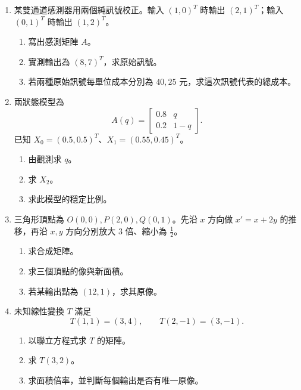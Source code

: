 \documentclass[11pt,a4paper]{article}
\providecommand{\tightlist}{%
  \setlength{\itemsep}{0pt}\setlength{\parskip}{0pt}}
\begin{document}
\begin{enumerate}
\def\labelenumi{\arabic{enumi}.}
\setcounter{enumi}{12}
\item
  某雙通道感測器用兩個純訊號校正。輸入 \((1,0)^T\) 時輸出 \((2,1)^T\)；輸入 \((0,1)^T\) 時輸出 \((1,2)^T\)。

  \begin{enumerate}
  \def\labelenumii{(\arabic{enumii})}
  \tightlist
  \item
    寫出感測矩陣 \(A\)。\\
  \item
    實測輸出為 \((8,7)^T\)，求原始訊號。\\
  \item
    若兩種原始訊號每單位成本分別為 \(40,25\) 元，求這次訊號代表的總成本。
  \end{enumerate}
\item
  兩狀態模型為
  \[
  A(q)=\begin{bmatrix}0.8&q\\0.2&1-q\end{bmatrix}.
  \]
  已知 \(X_0=(0.5,0.5)^T\)、\(X_1=(0.55,0.45)^T\)。

  \begin{enumerate}
  \def\labelenumii{(\arabic{enumii})}
  \tightlist
  \item
    由觀測求 \(q\)。\\
  \item
    求 \(X_2\)。\\
  \item
    求此模型的穩定比例。
  \end{enumerate}
\item
  三角形頂點為 \(O(0,0),P(2,0),Q(0,1)\)。先沿 \(x\) 方向做 \(x'=x+2y\) 的推移，再沿 \(x,y\) 方向分別放大 \(3\) 倍、縮小為 \(\frac12\)。

  \begin{enumerate}
  \def\labelenumii{(\arabic{enumii})}
  \tightlist
  \item
    求合成矩陣。\\
  \item
    求三個頂點的像與新面積。\\
  \item
    若某輸出點為 \((12,1)\)，求其原像。
  \end{enumerate}
\item
  未知線性變換 \(T\) 滿足
  \[
  T(1,1)=(3,4),\qquad T(2,-1)=(3,-1).
  \]

  \begin{enumerate}
  \def\labelenumii{(\arabic{enumii})}
  \tightlist
  \item
    以聯立方程式求 \(T\) 的矩陣。\\
  \item
    求 \(T(3,2)\)。\\
  \item
    求面積倍率，並判斷每個輸出是否有唯一原像。
  \end{enumerate}
\end{enumerate}
\end{document}
